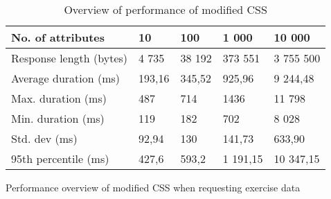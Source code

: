 \begin{table}[H]
\begin{subtable}{1.0\textwidth}
\centering
\begin{tabular}{lllll}
\textbf{No. of attributes} & \multicolumn{1}{l}{\textbf{10}} & \multicolumn{1}{l}{\textbf{100}} & \multicolumn{1}{l}{\textbf{1 000}} & \multicolumn{1}{l}{\textbf{10 000}} \\ \hline
Response length (bytes)    & 4 735                           & 38 192                           & 373 551                            & 3 755 500                           \\
Average duration (ms)      & 193,16                          & 345,52                           & 925,96                             & 9 244,48                            \\
Max. duration (ms)         & 487                             & 714                              & 1436                               & 11 798                              \\
Min. duration (ms)         & 119                             & 182                              & 702                                & 8 028                               \\
Std. dev (ms)              & 92,94                           & 130                              & 141,73                             & 633,90                              \\
95th percentile (ms)       & 427,6                           & 593,2                            & 1 191,15                           & 10 347,15                          
\end{tabular}
\caption{Performance overview of modified \acrshort{CSS} when requesting exercise data}
\label{table:results-modified-xml}
\end{subtable}

\caption{Overview of performance of modified \acrshort{CSS}}
\label{table:results-exp1-modified}

\end{table}